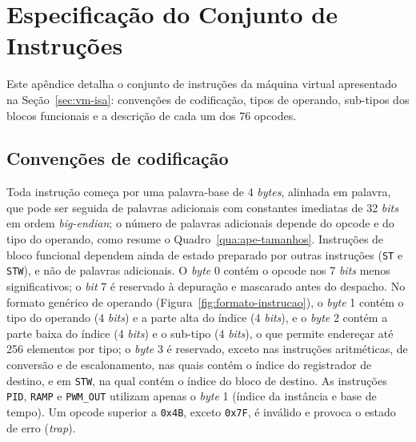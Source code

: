 \chapter{Especificação do Conjunto de Instruções}
\label{ape:isa}

Este apêndice detalha o conjunto de instruções da máquina virtual apresentado na Seção~\ref{sec:vm-isa}: convenções de codificação, tipos de operando, sub-tipos dos blocos funcionais e a descrição de cada um dos 76 opcodes.

\section{Convenções de codificação}
\label{sec:ape-isa-convencoes}

Toda instrução começa por uma palavra-base de 4 \textit{bytes}, alinhada em palavra, que pode ser seguida de palavras adicionais com constantes imediatas de 32 \textit{bits} em ordem \textit{big-endian}; o número de palavras adicionais depende do opcode e do tipo do operando, como resume o Quadro~\ref{qua:ape-tamanhos}.
Instruções de bloco funcional dependem ainda de estado preparado por outras instruções (\texttt{ST} e \texttt{STW}), e não de palavras adicionais.
O \textit{byte} 0 contém o opcode nos 7 \textit{bits} menos significativos; o \textit{bit} 7 é reservado à depuração e mascarado antes do despacho.
No formato genérico de operando (Figura~\ref{fig:formato-instrucao}), o \textit{byte} 1 contém o tipo do operando (4 \textit{bits}) e a parte alta do índice (4 \textit{bits}), e o \textit{byte} 2 contém a parte baixa do índice (4 \textit{bits}) e o sub-tipo (4 \textit{bits}), o que permite endereçar até 256 elementos por tipo; o \textit{byte} 3 é reservado, exceto nas instruções aritméticas, de conversão e de escalonamento, nas quais contém o índice do registrador de destino, e em \texttt{STW}, na qual contém o índice do bloco de destino.
As instruções \texttt{PID}, \texttt{RAMP} e \texttt{PWM\_OUT} utilizam apenas o \textit{byte} 1 (índice da instância e base de tempo).
Um opcode superior a \texttt{0x4B}, exceto \texttt{0x7F}, é inválido e provoca o estado de erro (\textit{trap}).

